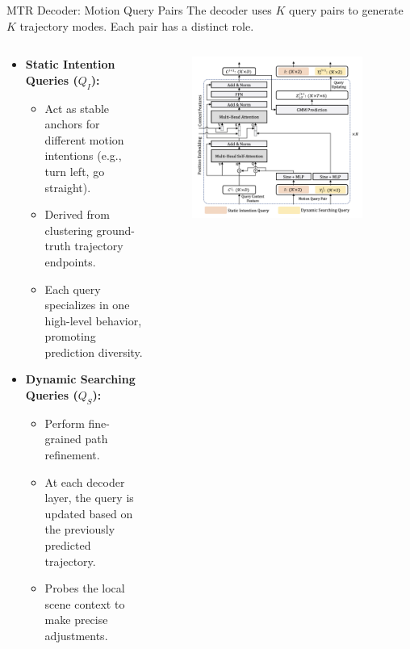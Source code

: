 \documentclass[10pt,aspectratio=169]{beamer}
\begin{document}
\begin{frame}{MTR Decoder: Motion Query Pairs}
    The decoder uses $K$ query pairs to generate $K$ trajectory modes. Each pair has a distinct role.
    \begin{columns}[T]
        \begin{column}{0.6\textwidth}
            \begin{itemize}
                \item\textbf{Static Intention Queries ($Q_I$):}
                \begin{itemize}
                    \item Act as stable anchors for different motion intentions (e.g., turn left, go straight).
                    \item Derived from clustering ground-truth trajectory endpoints.
                    \item Each query specializes in one high-level behavior, promoting prediction diversity.
                \end{itemize}
                \item\textbf{Dynamic Searching Queries ($Q_S$):}
                \begin{itemize}
                    \item Perform fine-grained path refinement.
                    \item At each decoder layer, the query is updated based on the previously predicted trajectory.
                    \item Probes the local scene context to make precise adjustments.
                \end{itemize}
            \end{itemize}
        \end{column}
        \begin{column}{0.4\textwidth}
            \begin{figure}
                \centering
                \includegraphics[width=0.9\textwidth]{docs/latex/figures/decoder_layer_detail.png}

\end{figure}
\end{column}
\end{columns}
\end{frame}
\end{document}
